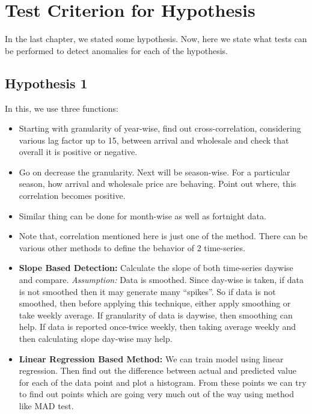 \section{Test Criterion for Hypothesis}

In the last chapter, we stated some hypothesis. Now, here we state what tests can be performed to detect anomalies for each of the hypothesis.

\subsection{Hypothesis 1}

In this, we use three functions:

\begin{itemize}

\item Starting with granularity of year-wise, find out cross-correlation, considering various lag factor up to 15,  between arrival and wholesale and check that overall it is positive or negative.

\item Go on decrease the granularity. Next will be season-wise. For a particular season, how arrival and wholesale price are behaving. Point out where, this correlation becomes positive.

\item Similar thing can be done for month-wise as well as fortnight data.

\item Note that, correlation mentioned here is just one of the method. There can be various other methods to define the behavior of 2 time-series.

\item \textbf{Slope Based Detection:} Calculate the slope of both time-series daywise and compare. \textit{Assumption:} Data is smoothed. Since day-wise is taken, if data is not smoothed then it may generate many “spikes”. So if data is not smoothed, then before applying this technique, either apply smoothing or take weekly average. If granularity of data is daywise, then smoothing can help. If data is reported once-twice weekly, then taking average weekly and then calculating slope day-wise may help.

\item \textbf{Linear Regression Based Method:} We can train model using linear regression. Then find out the difference between actual and predicted value for each of the data point and plot a histogram. From these points we can try to find out points which are going very much out of the way using method like MAD test.

\end{itemize}


